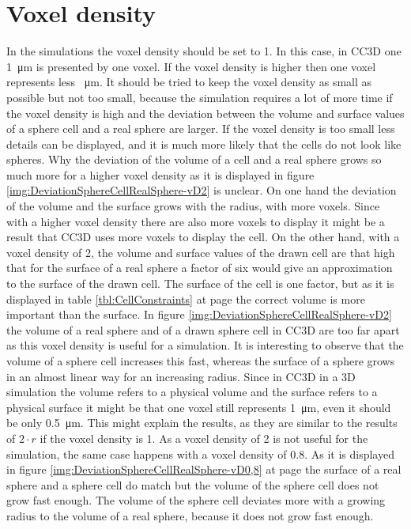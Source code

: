 \section{Voxel density}\label{sec:vD}
In the simulations the voxel density should be set to 1. In this case, in \ac{CC3D} one \SI{1}{\micro\metre} is presented by one voxel. If the voxel density is higher then one voxel represents less \SI{}{\micro\metre}. It should be tried to keep the voxel density as small as possible but not too small, because the simulation requires a lot of more time if the voxel density is high and the deviation between the volume and surface values of a sphere cell and a real sphere are larger. If the voxel density is too small less details can be displayed, and it is much more likely that the cells do not look like spheres. Why the deviation of the volume of a cell and a real sphere grows so much more for a higher voxel density as it is displayed in figure \ref{img:DeviationSphereCellRealSphere-vD2} is unclear. \newline
On one hand the deviation of the volume and the surface grows with the radius, with more voxels. Since with a higher voxel density there are also more voxels to display it might be a result that \ac{CC3D} uses more voxels to display the cell. On the other hand, with a voxel density of 2, the volume and surface values of the drawn cell are that high that for the surface of a real sphere a factor of six would give an approximation to the surface of the drawn cell. \newline
The surface of the cell is one factor, but as it is displayed in table \ref{tbl:CellConstraints} at page \pageref{tbl:CellConstraints} the correct volume is more important than the surface. In figure \ref{img:DeviationSphereCellRealSphere-vD2} the volume of a real sphere and of a drawn sphere cell in \ac{CC3D} are too far apart as this voxel density is useful for a simulation. It is interesting to observe that the volume of a sphere cell increases this fast, whereas the surface of a sphere grows in an almost linear way for an increasing radius. Since in \ac{CC3D} in a 3D simulation the volume refers to a physical volume and the surface refers to a physical surface it might be that one voxel still represents \SI{1}{\micro\metre}, even it should be only \SI{0.5}{\micro\metre}. This might explain the results, as they are similar to the results of $2 \cdot r$ if the voxel density is 1. \newline
As a voxel density of 2 is not useful for the simulation, the same case happens with a voxel density of 0.8. As it is displayed in figure \ref{img:DeviationSphereCellRealSphere-vD0,8} at page \pageref{img:DeviationSphereCellRealSphere-vD0,8} the surface of a real sphere and a sphere cell do match but the volume of the sphere cell does not grow fast enough. The volume of the sphere cell deviates more with a growing radius to the volume of a real sphere, because it does not grow fast enough. \newline

